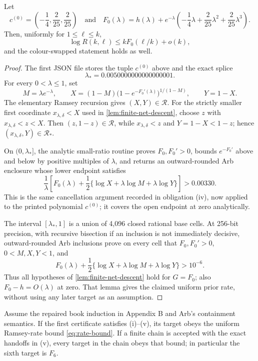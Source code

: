 \begin{lemma}\label{lem:elementary-first-prior}
Let
\[
 c^{(0)}=\left(-\frac14,\frac{2}{25},\frac{2}{25}\right)
 \quad\text{and}\quad
 F_0(\lambda)=h(\lambda)+e^{-\lambda}
 \left(-\frac14\lambda+\frac{2}{25}\lambda^2
 +\frac{2}{25}\lambda^3\right).
\]
Then, uniformly for \(1\le\ell\le k\),
\[
 \log R(k,\ell)\le kF_0(\ell/k)+o(k),
\]
and the colour-swapped statement holds as well.
\end{lemma}

\begin{proof}
The first JSON file stores the tuple \(c^{(0)}\) above and the exact splice
\[
 \lambda_*=0.0050000000000000001.
\]
For every \(0<\lambda\le1\), set
\[
 M=\lambda e^{-\lambda},\qquad
 X=(1-M)\bigl(1-e^{-F_0'(\lambda)}\bigr)^{1/(1-M)},
 \qquad Y=1-X.
\]
The elementary Ramsey recursion gives \((X,Y)\in\mathcal R\).  For the
strictly smaller first coordinate \(x_{\lambda,\delta}<X\) used in
\cref{lem:finite-net-descent}, choose \(z\) with
\(x_{\lambda,\delta}<z<X\).  Then
\((z,1-z)\in\mathcal R\), while
\(x_{\lambda,\delta}<z\) and \(Y=1-X<1-z\); hence
\((x_{\lambda,\delta},Y)\in\mathcal R_*\).

On \((0,\lambda_*]\), the analytic small-ratio routine proves
\(F_0,F_0'>0\), bounds \(e^{-F_0'}\) above and below by positive multiples of
\(\lambda\), and returns an outward-rounded Arb enclosure whose lower
endpoint satisfies
\[
 \frac1\lambda\left[F_0(\lambda)+\frac12
 \{\log X+\lambda\log M+\lambda\log Y\}\right]
 >0.00330.
\]
This is the same cancellation argument recorded in obligation (iv), now
applied to the printed polynomial \(c^{(0)}\); it covers the open endpoint at
zero analytically.

The interval \([\lambda_*,1]\) is a union of 4,096 closed rational base
cells.  At 256-bit precision, with recursive bisection if an inclusion is not
immediately decisive, outward-rounded Arb inclusions prove on every cell that
\(F_0,F_0'>0\), \(0<M,X,Y<1\), and
\[
 F_0(\lambda)+\frac12
 \{\log X+\lambda\log M+\lambda\log Y\}
 >10^{-6}.
\]
Thus all hypotheses of \cref{lem:finite-net-descent} hold for \(G=F_0\);
also \(F_0-h=O(\lambda)\) at zero.  That lemma gives the claimed uniform
prior rate, without using any later target as an assumption.
\end{proof}

\begin{proposition}\label{prop:rate-correctness}
Assume the repaired book induction in Appendix B and Arb's containment
semantics.  If the first certificate satisfies (i)--(v), its target obeys the
uniform Ramsey-rate bound \eqref{eq:rate-bound}.  If a finite chain is accepted with the exact
handoffs in (v), every target in the chain obeys that bound; in particular the
sixth target is \(F_6\).
\end{proposition}

